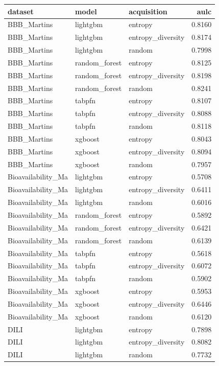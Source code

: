 \begin{tabular}{lllr}
\toprule
dataset & model & acquisition & aulc \\
\midrule
BBB_Martins & lightgbm & entropy & 0.8160 \\
BBB_Martins & lightgbm & entropy_diversity & 0.8174 \\
BBB_Martins & lightgbm & random & 0.7998 \\
BBB_Martins & random_forest & entropy & 0.8125 \\
BBB_Martins & random_forest & entropy_diversity & 0.8198 \\
BBB_Martins & random_forest & random & 0.8241 \\
BBB_Martins & tabpfn & entropy & 0.8107 \\
BBB_Martins & tabpfn & entropy_diversity & 0.8088 \\
BBB_Martins & tabpfn & random & 0.8118 \\
BBB_Martins & xgboost & entropy & 0.8043 \\
BBB_Martins & xgboost & entropy_diversity & 0.8094 \\
BBB_Martins & xgboost & random & 0.7957 \\
Bioavailability_Ma & lightgbm & entropy & 0.5708 \\
Bioavailability_Ma & lightgbm & entropy_diversity & 0.6411 \\
Bioavailability_Ma & lightgbm & random & 0.6016 \\
Bioavailability_Ma & random_forest & entropy & 0.5892 \\
Bioavailability_Ma & random_forest & entropy_diversity & 0.6421 \\
Bioavailability_Ma & random_forest & random & 0.6139 \\
Bioavailability_Ma & tabpfn & entropy & 0.5618 \\
Bioavailability_Ma & tabpfn & entropy_diversity & 0.6072 \\
Bioavailability_Ma & tabpfn & random & 0.5902 \\
Bioavailability_Ma & xgboost & entropy & 0.5953 \\
Bioavailability_Ma & xgboost & entropy_diversity & 0.6446 \\
Bioavailability_Ma & xgboost & random & 0.6120 \\
DILI & lightgbm & entropy & 0.7898 \\
DILI & lightgbm & entropy_diversity & 0.8082 \\
DILI & lightgbm & random & 0.7732 \\

\end{tabular}

